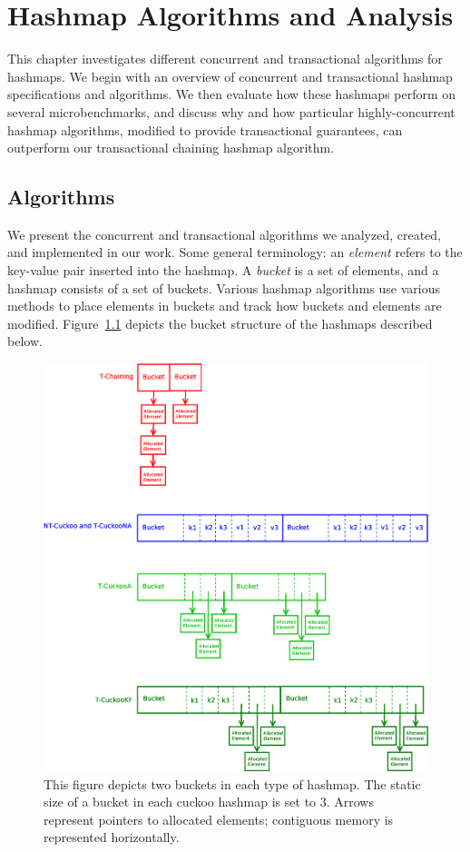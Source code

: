 \chapter{Hashmap Algorithms and Analysis}
\label{hashmap}

This chapter investigates different concurrent and transactional algorithms for hashmaps. We begin with an overview of concurrent and transactional hashmap specifications and algorithms. We then evaluate how these hashmaps perform on several microbenchmarks, and discuss why and how particular highly-concurrent hashmap algorithms, modified to provide transactional guarantees, can outperform our transactional chaining hashmap algorithm.

\section{Algorithms}

We present the concurrent and transactional algorithms we analyzed, created, and implemented in our work. Some general terminology: an \emph{element} refers to the key-value pair inserted into the hashmap. A \emph{bucket} is a set of elements, and a hashmap consists of a set of buckets. Various hashmap algorithms use various methods to place elements in buckets and track how buckets and elements are modified. Figure~\ref{fig:hashmap_buckets} depicts the bucket structure of the hashmaps described below.


\begin{figure}[t]
\centering
\includegraphics[width=\linewidth]{hashmap_finds}
    \caption[Bucket Structure of Different Hashmaps]{This figure depicts two buckets in each type of hashmap. The static size of a bucket in each cuckoo hashmap is set to 3. Arrows represent pointers to allocated elements; contiguous memory is represented horizontally.}
\label{fig:hashmap_buckets}
\end{figure}


